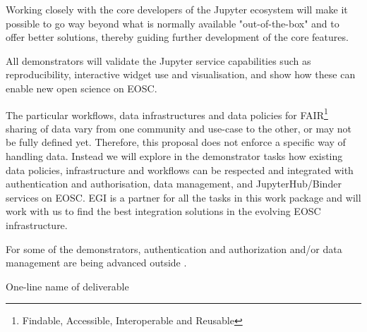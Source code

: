 \begin{workpackage}
\begin{wpdescription}
  Working closely with the core developers of the Jupyter ecosystem will make it possible to
  go way beyond what is normally available "out-of-the-box" and to offer better solutions,
  thereby guiding further development of the core features.

  \medskip

  All demonstrators will validate the Jupyter service capabilities such as reproducibility,
  interactive widget use and visualisation, and show how these can
  enable new open science on EOSC.

  The particular workflows, data infrastructures and data policies for
  FAIR\footnote{Findable, Accessible, Interoperable and Reusable} sharing of data vary from one community and use-case to
  the other, or may not be fully defined yet. Therefore, this proposal
  does not enforce a specific way of handling data. Instead we
  will explore in the demonstrator tasks how existing data policies,
  infrastructure and workflows can be respected and integrated with
  authentication and authorisation, data management, and
  JupyterHub/Binder services on EOSC. EGI is a partner
  for all the tasks in this work package and will work with us to find the
  best integration solutions in the evolving EOSC
  infrastructure.

  For some of the demonstrators, authentication and authorization and/or
  data management are being advanced outside \TheProject.


\end{wpdescription}

\begin{tasklist}



\end{tasklist}



\begin{wpdelivs}
\begin{wpdeliv}[
    id=deliv,
    lead=XXX,
    due=12,
    miles=startup,
    dissem=PU,
    nature=DEC,
]
  {
  One-line name of deliverable
  }
\end{wpdeliv}


\end{wpdelivs}
\end{workpackage}

